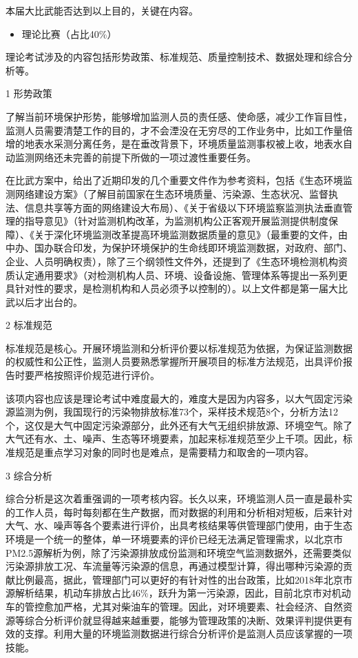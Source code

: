 \documentclass[
]{book}
\providecommand{\tightlist}{%
  \setlength{\itemsep}{0pt}\setlength{\parskip}{0pt}}
\begin{document}
本届大比武能否达到以上目的，关键在内容。

\begin{itemize}
\tightlist
\item
  理论比赛（占比40\%）
\end{itemize}

理论考试涉及的内容包括形势政策、标准规范、质量控制技术、数据处理和综合分析等。

1 形势政策

了解当前环境保护形势，能够增加监测人员的责任感、使命感，减少工作盲目性，监测人员需要清楚工作的目的，才不会湮没在无穷尽的工作业务中，比如工作量倍增的地表水采测分离任务，是在垂改背景下，环境质量监测事权被上收，地表水自动监测网络还未完善的前提下所做的一项过渡性重要任务。

在比武方案中，给出了近期印发的几个重要文件作为参考资料，包括《生态环境监测网络建设方案》（了解目前国家在生态环境质量、污染源、生态状况、监督执法、信息共享等方面的网络建设大布局）、《关于省级以下环境监察监测执法垂直管理的指导意见》（针对监测机构改革，为监测机构公正客观开展监测提供制度保障）、《关于深化环境监测改革提高环境监测数据质量的意见》（最重要的文件，由中办、国办联合印发，为保护环境保护的生命线即环境监测数据，对政府、部门、企业、人员明确权责），除了三个纲领性文件外，还提到了《生态环境检测机构资质认定通用要求》（对检测机构人员、环境、设备设施、管理体系等提出一系列更具针对性的要求，是检测机构和人员必须予以控制的）。以上文件都是第一届大比武以后才出台的。

2 标准规范

标准规范是核心。开展环境监测和分析评价要以标准规范为依据，为保证监测数据的权威性和公正性，监测人员要熟悉掌握所开展项目的标准方法规范，出具评价报告时要严格按照评价规范进行评价。

该项内容也应该是理论考试中难度最大的，难度大是因为内容多，以大气固定污染源监测为例，我国现行的污染物排放标准73个，采样技术规范8个，分析方法12个，这仅是大气中固定污染源部分，此外还有大气无组织排放源、环境空气。除了大气还有水、土、噪声、生态等环境要素，加起来标准规范至少上千项。因此，标准规范是重点学习对象的同时也是难点，是需要精力和取舍的一项内容。

3 综合分析

综合分析是这次着重强调的一项考核内容。长久以来，环境监测人员一直是最朴实的工作人员，每时每刻都在生产数据，而对数据的利用和分析相对短板，后来针对大气、水、噪声等各个要素进行评价，出具考核结果等供管理部门使用，由于生态环境是一个统一的整体，单一环境要素的评价已经无法满足管理需求，以北京市PM2.5源解析为例，除了污染源排放成份监测和环境空气监测数据外，还需要类似污染源排放工况、车流量等污染源的信息，再通过模型计算，得出哪种污染源的贡献比例最高，据此，管理部门可以更好的有针对性的出台政策，比如2018年北京市源解析结果，机动车排放占比46\%，跃升为第一污染源，因此，目前北京市对机动车的管控愈加严格，尤其对柴油车的管理。因此，对环境要素、社会经济、自然资源等综合分析评价就显得越来越重要，能够为管理政策的决断、效果评判提供更有效的支撑。利用大量的环境监测数据进行综合分析评价是监测人员应该掌握的一项技能。
\end{document}
